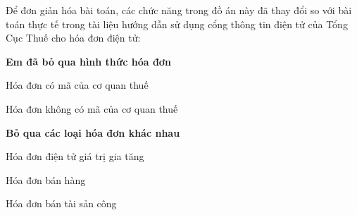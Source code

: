 Để đơn giản hóa bài toán, các chức năng trong đồ án này đã thay đổi so với bài toán thực tế trong tài liệu hướng dẫn sử dụng cổng thông tin điện tử của Tổng Cục Thuế cho hóa đơn điện tử:













\textbf{Em đã bỏ qua hình thức hóa đơn}













Hóa đơn có mã của cơ quan thuế













Hóa đơn không có mã của cơ quan thuế













\textbf{Bỏ qua các loại hóa đơn khác nhau}













Hóa đơn điện tử giá trị gia tăng













Hóa đơn bán hàng













Hóa đơn bán tài sản công













